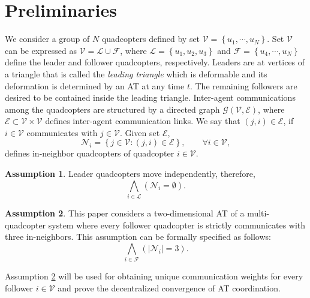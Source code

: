 \documentclass[journal]{IEEEtran}
\theoremstyle{definition}
\newtheorem{assumption}{Assumption}
\theoremstyle{plain}
\begin{document}
\section{Preliminaries}\label{Prem}
We consider a group of $N$ quadcopters defined by set $\mathcal{V}=\left\{u_1,\cdots,u_N\right\}$. Set $\mathcal{V}$ can be expressed as $\mathcal{V}=\mathcal{L}\cup \mathcal{F}$, where $\mathcal{L}=\left\{u_1,u_2,u_3\right\}$ and $\mathcal{F}=\left\{u_4,\cdots,u_N\right\}$ define  the leader and follower quadcopters, respectively. Leaders are at vertices of a triangle that is called the \textit{leading triangle} which is deformable and its deformation is determined by an AT at any time $t$.  The remaining followers are desired to be contained inside the leading triangle. Inter-agent communications among the quadcopters are structured by a directed graph $\mathcal{G}\left(\mathcal{V},\mathcal{E}\right)$, where $\mathcal{E}\subset \mathcal{V}\times \mathcal{V}$ defines inter-agent communication links. We say that $(j,i)\in \mathcal{E}$, if $i\in \mathcal{V}$ communicates with $j\in \mathcal{V}$. Given set $\mathcal{E}$, 
\begin{equation}
    \mathcal{N}_i=\left\{j\in\mathcal{V}:\left(j,i\right)\in \mathcal{E} \right\},\qquad \forall i\in \mathcal{V},
\end{equation}
defines in-neighbor quadcopters of quadcopter $i\in \mathcal{V}$. 
\begin{assumption}\label{asum1}
    Leader quadcopters move independently, therefore, 
    \begin{equation}
        \bigwedge_{i\in \mathcal{L}}\left(\mathcal{N}_i=\emptyset\right).
    \end{equation}
\end{assumption}\label{asum2}
\begin{assumption}\label{structurconst}
    This paper considers a two-dimensional AT of a multi-quadcopter system where every follower quadcopter is strictly communicates with three in-neighbors. This assumption can be formally specified as follows:
    \begin{equation}
        \bigwedge_{i\in \mathcal{F}}\left(\left|\mathcal{N}_i\right|=3\right).
    \end{equation}
\end{assumption}
Assumption \ref{structurconst} will be used for obtaining unique communication weights for every follower $i\in \mathcal{V}$ and  prove the decentralized convergence of AT coordination.
\end{document}
